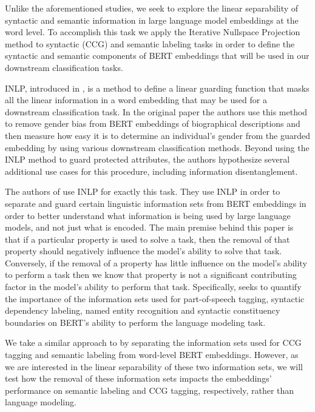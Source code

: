 \documentclass[11pt,a4paper]{article}
\begin{document}
Unlike the aforementioned studies, we seek to explore the linear separability of syntactic and semantic information in large language model embeddings at the word level. To accomplish this task we apply the Iterative Nullspace Projection method to syntactic (CCG) and semantic labeling tasks in order to define the syntactic and semantic components of BERT embeddings that will be used in our downstream classification tasks. 

INLP, introduced in \citealp{inlp}, is a method to define a linear guarding function that masks all the linear information in a word embedding that may be used for a downstream classification task. In the original paper the authors use this method to remove gender bias from BERT embeddings of biographical descriptions and then measure how easy it is to determine an individual's gender from the guarded embedding by using various downstream classification methods. Beyond using the INLP method to guard protected attributes, the authors hypothesize several additional use cases for this procedure, including information disentanglement. 

The authors of \citealp{amnesia} use INLP for exactly this task. They use INLP in order to separate and guard certain linguistic information sets from BERT embeddings in order to better understand what information is being used by large language models, and not just what is encoded. The main premise behind this paper is that if a particular property is used to solve a task, then the removal of that property should negatively influence the model's ability to solve that task. Conversely, if the removal of a property has little influence on the model's ability to perform a task then we know that property is not a significant contributing factor in the model's ability to perform that task. Specifically, \citealp{amnesia} seeks to quantify the importance of the information sets used for part-of-speech tagging, syntactic dependency labeling, named entity recognition and syntactic constituency boundaries on BERT's ability to perform the language modeling task. 

We take a similar approach to \citealp{amnesia} by separating the information sets used for CCG tagging and semantic labeling from word-level BERT embeddings. However, as we are interested in the linear separability of these two information sets, we will test how the removal of these information sets impacts the embeddings' performance on semantic labeling and CCG tagging, respectively, rather than language modeling. 
\end{document}
